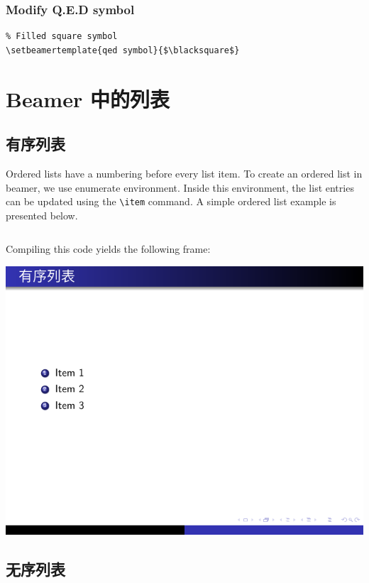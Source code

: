 \subsubsection{Modify Q.E.D symbol}
\begin{verbatim}
% Filled square symbol
\setbeamertemplate{qed symbol}{$\blacksquare$}
\end{verbatim}

\section{Beamer 中的列表}

\subsection{有序列表}

Ordered lists have a numbering before every list item. To create an ordered list in beamer, we use enumerate environment. Inside this environment, the list entries can be updated using the \verb|\item| command. A simple ordered list example is presented below.

\inputminted[linenos=true]{latex}{examples/beamer/list-ordered.tex}

Compiling this code yields the following frame:

\includegraphics{examples/beamer/list-ordered.pdf}

\subsection{无序列表}

